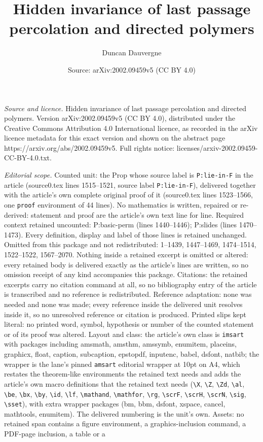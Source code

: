 \documentclass[10pt,a4paper]{amsart}
\title[Hidden invariance of last passage percolation and directed p]{Hidden invariance of last passage percolation and directed polymers}
\author{Duncan Dauvergne}
\date{Source: arXiv:2002.09459v5 (CC BY 4.0)}
\begin{document}
\maketitle

\noindent\emph{Source and licence.} Hidden invariance of last passage percolation and directed polymers. Version arXiv:2002.09459v5 (CC BY 4.0), distributed under the Creative Commons Attribution 4.0 International licence, as recorded in the arXiv licence metadata for this exact version and shown on the abstract page https://arxiv.org/abs/2002.09459v5. Full rights notice: licenses/arxiv-2002.09459-CC-BY-4.0.txt.\par\smallskip

\noindent\textit{Editorial scope.} Counted unit: the Prop whose source label is \texttt{P:lie-in-F} in the article (source0.tex lines 1515--1521, source label \texttt{P:lie-in-F}), delivered together with the article's own complete original proof of it (source0.tex lines 1523--1566, one \texttt{proof} environment of 44 lines). No mathematics is written, repaired or re-derived: statement and proof are the article's own text line for line. Required context retained uncounted: P:basic-perm (lines 1440--1446); P:slides (lines 1470--1473). Every definition, display and label of those lines is retained unchanged. Omitted from this package and not redistributed: 1--1439, 1447--1469, 1474--1514, 1522--1522, 1567--2070. Nothing inside a retained excerpt is omitted or altered: every retained body is delivered exactly as the article's lines are written, so no omission receipt of any kind accompanies this package. Citations: the retained excerpts carry no citation command at all, so no bibliography entry of the article is transcribed and no reference is redistributed. Reference adaptation: none was needed and none was made; every reference inside the delivered unit resolves inside it, so no unresolved reference or citation is produced. Printed slips kept literal: no printed word, symbol, hypothesis or number of the counted statement or of its proof was altered. Layout and class: the article's own class is \texttt{imsart} with packages including amsmath, amsthm, amssymb, enumitem, placeins, graphicx, float, caption, subcaption, epstopdf, inputenc, babel, dsfont, natbib; the wrapper is the lane's pinned \texttt{amsart} editorial wrapper at 10pt on A4, which restates the theorem-like environments the retained text needs and adds the article's own macro definitions that the retained text needs (\texttt{\textbackslash X}, \texttt{\textbackslash Z}, \texttt{\textbackslash Zd}, \texttt{\textbackslash al}, \texttt{\textbackslash be}, \texttt{\textbackslash bx}, \texttt{\textbackslash by}, \texttt{\textbackslash id}, \texttt{\textbackslash lf}, \texttt{\textbackslash mathand}, \texttt{\textbackslash mathfor}, \texttt{\textbackslash rg}, \texttt{\textbackslash scrF}, \texttt{\textbackslash scrH}, \texttt{\textbackslash scrN}, \texttt{\textbackslash sig}, \texttt{\textbackslash sset}), with extra wrapper packages (bm, bbm, dsfont, xspace, cancel, mathtools, enumitem). The delivered numbering is the unit's own. Assets: no retained span contains a figure environment, a graphics-inclusion command, a PDF-page inclusion, a table or a 
\end{document}
